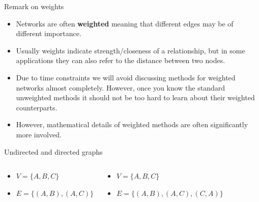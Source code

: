 \documentclass[
    hyperref={colorlinks,linkcolor=blue,urlcolor=blue,citecolor=blue}
]{beamer}
\begin{document}
\begin{frame}{Remark on weights}
\begin{itemize}
    \item<1-> Networks are often \textbf{weighted} meaning that different edges
    may be of different importance.
    \item<2-> Usually weights indicate strength/closeness of a relationship,
    but in some applications they can also refer to the distance between
    two nodes.
    \item<3-> Due to time constraints we will avoid discussing methods for
    weighted networks almost completely. However, once you know the standard
    unweighted methods it should not be too hard to learn about their
    weighted counterparts.
    \item<4-> However, mathematical details of weighted methods are often
    significantly more involved.
\end{itemize}
\end{frame}

\begin{frame}{Undirected and directed graphs}
\begin{columns}
\begin{center}
    \begin{itemize}
        \item $V = \{A, B, C\}$
        \item $E = \{(A, B), (A, C)\}$
    \end{itemize}
    \end{center}
\pause
{}
\begin{center}
    \begin{itemize}
        \item $V = \{A, B, C\}$
        \item $E = \{(A, B), (A, C), (C, A)\}$
    \end{itemize}
\end{center}
\end{columns}
\end{frame}
\end{document}
